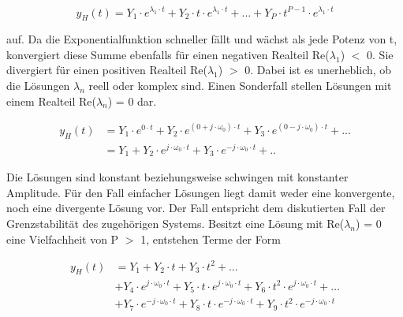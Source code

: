 \begin{equation}\label{eq:threehundredfourtyfour}
y_{H} \left(t\right)=Y_{1} \cdot e^{\lambda _{1} \cdot t} +Y_{2} \cdot t\cdot e^{\lambda _{1} \cdot t} +...+Y_{P} \cdot t^{P-1} \cdot e^{\lambda _{1} \cdot t}
\end{equation}

\noindent auf. Da die Exponentialfunktion schneller f\"{a}llt und w\"{a}chst als jede Potenz von t, konvergiert diese Summe ebenfalls f\"{u}r einen negativen Realteil Re($\lambda_{1}$) $\mathrm{<}$ 0. Sie divergiert f\"{u}r einen positiven Realteil Re($\lambda_{1}$) $\mathrm{>}$ 0. Dabei ist es unerheblich, ob die L\"{o}sungen $\lambda_{n}$ reell oder komplex sind.\newline
Einen Sonderfall stellen L\"{o}sungen mit einem Realteil Re($\lambda_{n}$) = 0 dar.

\begin{equation}\label{eq:threehundredfourtyfive}
\begin{split}
y_{H} \left(t\right) & = Y_{1} \cdot e^{0\cdot t} +Y_{2} \cdot e^{\left(0+j\cdot \omega _{0} \right)\cdot t} +Y_{3} \cdot e^{\left(0-j\cdot \omega _{0} \right)\cdot t} +...\\ 
& = Y_{1} +Y_{2} \cdot e^{j\cdot \omega _{0} \cdot t} +Y_{3} \cdot e^{-j\cdot \omega _{0} \cdot t} +..
\end{split}
\end{equation}

\noindent Die L\"{o}sungen sind konstant beziehungsweise schwingen mit konstanter Amplitude. F\"{u}r den Fall einfacher L\"{o}sungen liegt damit weder eine konvergente, noch eine divergente L\"{o}sung vor. Der Fall entspricht dem diskutierten Fall der Grenzstabilit\"{a}t des zugeh\"{o}rigen Systems. \newline
Besitzt eine L\"{o}sung mit Re($\lambda_{n}$) = 0 eine Vielfachheit von P $\mathrm{>}$ 1, entstehen Terme der Form

\begin{equation}\label{eq:threehundredfourtysix}
\begin{split}
y_{H} \left(t\right) & = Y_{1} +Y_{2} \cdot t+Y_{3} \cdot t^{2} +... \\ 
&  +Y_{4} \cdot e{}^{j\cdot \omega _{0} \cdot t} +Y{}_{5} \cdot t\cdot e{}^{j\cdot \omega _{0} \cdot t} +Y{}_{6} \cdot t{}^{2} \cdot e{}^{j\cdot \omega _{0} \cdot t} +...\\ 
& +Y{}_{7} \cdot e{}^{-j\cdot \omega _{0} \cdot t} +Y{}_{8} \cdot t\cdot e{}^{-j\cdot \omega _{0} \cdot t} +Y{}_{9} \cdot t{}^{2} \cdot e{}^{-j\cdot \omega _{0} \cdot t}
\end{split}
\end{equation}

